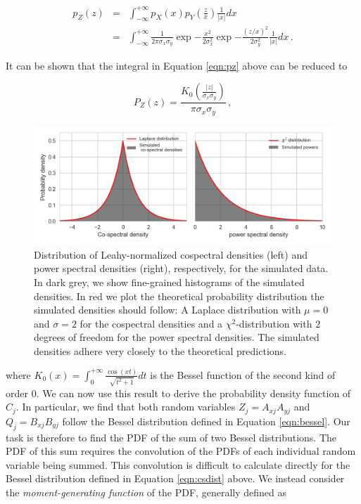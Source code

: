 \documentclass[12pt]{emulateapj}
\begin{document}
\begin{eqnarray}
p_Z(z) & = & \int_{-\infty}^{+\infty}{p_X(x) p_Y(\frac{z}{x}) \frac{1}{|x|} dx} \nonumber \\
	   & = &  \int_{-\infty}^{+\infty}{\frac{1}{2 \pi \sigma_x \sigma_y} \exp{-\frac{x^2}{2\sigma_x^2}} \exp{-\frac{(z/x)^2}{2\sigma_y^2}} \frac{1}{|x|} dx} \label{eqn:pz} \, .
\end{eqnarray}

\noindent It can be shown \citep{watson1922,wishart1932} that the integral in Equation \ref{eqn:pz} above can be reduced to

\begin{equation}
\label{eqn:bessel}
P_Z(z) = \frac{K_0\left( \frac{|z|}{\sigma_x \sigma_y}\right)}{\pi \sigma_x \sigma_y} \, ,
\end{equation}

\begin{figure}
\begin{center}
\includegraphics[width=\textwidth]{cs_dist.png}
\caption{Distribution of Leahy-normalized cospectral densities (left) and power spectral densities (right), respectively, for the simulated data. In dark grey, we show fine-grained histograms of the simulated densities. In red we plot the theoretical probability distribution the simulated densities should follow: A Laplace distribution with $\mu=0$ and $\sigma=2$ for the cospectral densities and a $\chi^2$-distribution with $2$ degrees of freedom for the power spectral densities. The simulated densities adhere very closely to the theoretical predictions.}
\label{fig:csdist}
\end{center}
\end{figure}

\noindent where $K_0(x) = \int_{0}^{+\infty}{\frac{\cos{(xt)}}{\sqrt{t^2 + 1}} dt}$ is the Bessel function of the second kind of order $0$. We can now use this result to derive the probability density function of $C_j$. In particular, we find that both random variables $Z_j = A_{xj} A_{yj}$ and $Q_j = B_{xj} B_{yj}$ follow the Bessel distribution defined in Equation \ref{eqn:bessel}. Our task is therefore to find the PDF of the sum of two Bessel distributions. The PDF of this sum requires the convolution of the PDFs of each individual random variable being summed. This convolution is difficult to calculate directly for the Bessel distribution defined in Equation \ref{eqn:csdist} above. We instead consider the \textit{moment-generating function} of the PDF, generally defined as 
\end{document}
